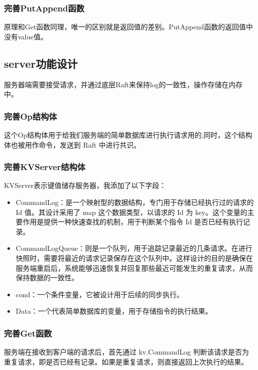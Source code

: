 \documentclass[]{article}
\begin{document}
	\subsubsection{完善PutAppend函数}
	原理和Get函数同理，唯一的区别就是返回值的差别。PutAppend函数的返回值中没有value值。
	\subsection{server功能设计}
	服务器端需要接受请求，并通过底层Raft来保持log的一致性，操作存储在内存中。
	\subsubsection{完善Op结构体}
	这个Op结构体用于给我们服务端的简单数据库进行执行请求用的,同时，这个结构体也被用作命令，发送到 Raft 中进行共识。
	
	\subsubsection{完善KVServer结构体}
	KVServer表示键值储存服务器，我添加了以下字段：
	\begin{itemize}
		\item CommandLog：是一个映射型的数据结构，专门用于存储已经执行过的请求的 Id 值。其设计采用了 map 这个数据类型，以请求的 Id 为 key。这个变量的主要作用是提供一种快速查找的机制，用于判断某个指令 Id 是否已经有执行记录。
		\item CommandLogQueue：则是一个队列，用于追踪记录最近的几条请求。在进行快照时，需要将最近的请求记录保存在这个队列中。这样设计的目的是确保在服务端重启后，系统能够迅速恢复并回复那些最近可能发生的重复请求，从而保持数据的一致性。
		\item cond：一个条件变量，它被设计用于后续的同步执行。
		\item Data：一个代表简单数据库的变量，用于存储指令的执行结果。
	\end{itemize}
	
	\subsubsection{完善Get函数}
	服务端在接收到客户端的请求后，首先通过 kv.CommandLog 判断该请求是否为重复请求，即是否已经有记录。如果是重复请求，则直接返回上次执行的结果。
	
\end{document}
